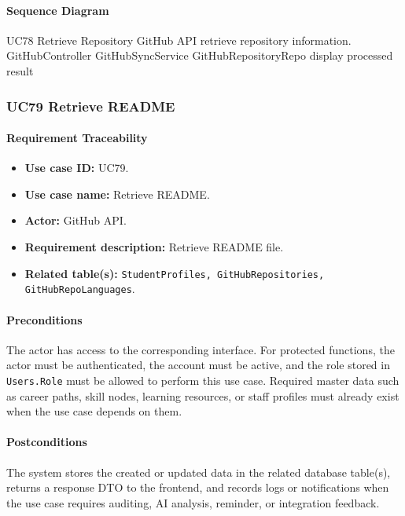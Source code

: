 \paragraph{Sequence Diagram}

\SequenceDiagram
{UC78 Retrieve Repository}
{GitHub API}
{retrieve repository information.}
{GitHubController}
{GitHubSyncService}
{GitHubRepositoryRepo}
{display processed result}

\subsubsection{UC79 Retrieve README}

\paragraph{Requirement Traceability}

\begin{itemize}
    \item \textbf{Use case ID:} UC79.
    \item \textbf{Use case name:} Retrieve README.
    \item \textbf{Actor:} GitHub API.
    \item \textbf{Requirement description:} Retrieve README file.
    \item \textbf{Related table(s):} \texttt{StudentProfiles, GitHubRepositories, GitHubRepoLanguages}.
\end{itemize}

\paragraph{Preconditions}

The actor has access to the corresponding interface. For protected functions, the actor must be authenticated, the account must be active, and the role stored in \texttt{Users.Role} must be allowed to perform this use case. Required master data such as career paths, skill nodes, learning resources, or staff profiles must already exist when the use case depends on them.

\paragraph{Postconditions}

The system stores the created or updated data in the related database table(s), returns a response DTO to the frontend, and records logs or notifications when the use case requires auditing, AI analysis, reminder, or integration feedback.

